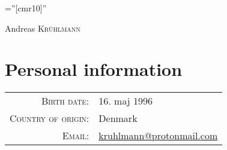 \documentclass[a4paper,10pt]{article}
\begin{document}

\pagestyle{empty} %

\font\fb=''[cmr10]'' %

\par{\centering
		{\Huge Andreas \textsc{Kr\"uhlmann}
	}\bigskip\par}

\section{Personal information}

\begin{tabular}{rl}
    \textsc{Birth date:} & 16. maj 1996\\
    \textsc{Country of origin:}     & Denmark\\
    \textsc{Email:}       & \href{mailto:kruhlmann@protonmail.com}{kruhlmann@protonmail.com}
\end{tabular}

\end{document}
